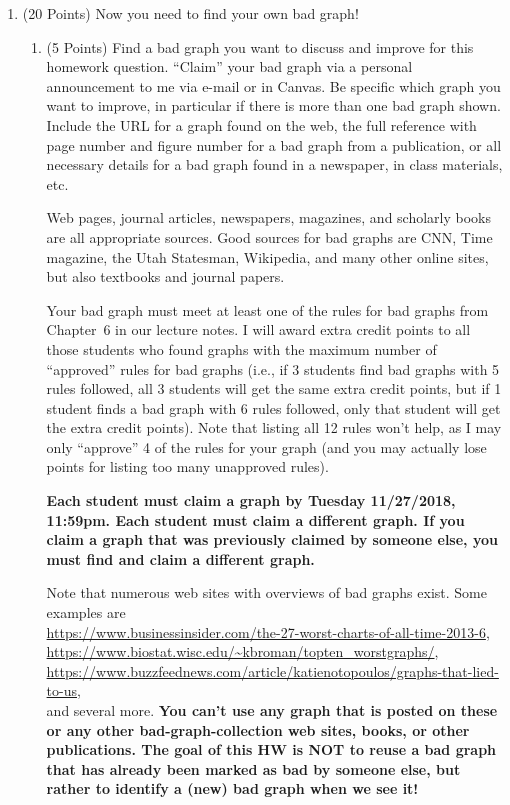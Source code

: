 \documentclass[12pt,letterpaper,final]{article}
\begin{document}
\begin{enumerate}
\item (20 Points) Now you need to find your own bad graph!

\begin{enumerate}
\item (5 Points) Find a bad graph you want to discuss and improve for this homework question.
``Claim'' your bad graph via a personal announcement to me via e-mail or in Canvas. Be specific
which graph you want to improve, in particular if there is more than one bad graph
shown. Include the URL for a graph found on the web, the full reference with page number 
and figure number for a bad graph from a publication, or all necessary details
for a bad graph found in a newspaper, in class materials, etc. 

Web pages, journal articles,
newspapers, magazines, and scholarly books are all appropriate sources.
Good sources for bad graphs are CNN, Time magazine,
the Utah Statesman, Wikipedia, and many other online sites,
but also textbooks and journal papers.

Your bad graph must meet at least one of the rules for bad graphs from Chapter~6
in our lecture notes. I will award extra credit points to all those students
who found graphs with the maximum number of ``approved'' rules for bad graphs
(i.e., if 3 students find bad graphs with 5 rules followed, all 3 students will get
the same extra credit points, but if 1 student finds a bad graph with 6 rules followed,
only that student will get the extra credit points).
Note that listing all 12 rules won't help, as I may only ``approve'' 4 of the
rules for your graph (and you may actually lose points for listing too many unapproved rules).

{\bf Each student must claim a graph by Tuesday 11/27/2018, 11:59pm. Each student must
claim a different graph. If you claim a graph that was previously claimed by someone
else, you must find and claim a different graph.}

Note that numerous web sites with overviews of bad graphs exist.
Some examples are \\
\url{https://www.businessinsider.com/the-27-worst-charts-of-all-time-2013-6}, \\
\url{https://www.biostat.wisc.edu/~kbroman/topten_worstgraphs/}, \\
\url{https://www.buzzfeednews.com/article/katienotopoulos/graphs-that-lied-to-us}, \\
and several more.
{\bf You can't use any graph that is posted on these or any other
bad-graph-collection web sites, books, or other publications.
The goal of this HW is NOT to reuse a bad graph that has already been marked
as bad by someone else, but rather to identify a (new) bad graph when
we see it!}



\end{enumerate}
\end{enumerate}
\end{document}
